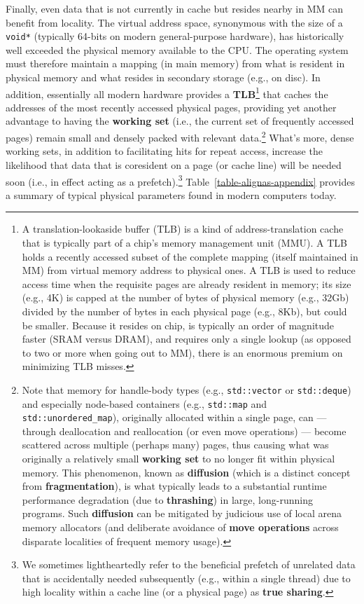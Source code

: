 Finally, even data that is not currently in cache but resides nearby in
MM can benefit from locality. The virtual address space, synonymous with
the size of a \texttt{void*} (typically 64-bits on modern general-purpose hardware), has historically well exceeded the physical memory
available to the CPU. The operating system must therefore maintain a
mapping (in main memory) from what is resident in physical memory and
what resides in secondary storage (e.g., on disc). In addition,
essentially all modern hardware provides a
\textbf{TLB}{\cprotect\footnote{A translation-lookaside buffer (TLB) is
a kind of address-translation cache that is typically part of a chip's
memory management unit (MMU). A TLB holds a recently accessed subset
of the complete mapping (itself maintained in MM) from virtual memory
address to physical ones. A TLB is used to reduce access time when the
requisite pages are already resident in memory; its size (e.g., 4K) is
capped at the number of bytes of physical memory (e.g., 32Gb) divided
by the number of bytes in each physical page (e.g., 8Kb), but could be
smaller. Because it resides on chip, is typically an order of
magnitude faster (SRAM versus DRAM), and requires only a single lookup
(as opposed to two or more when going out to MM), there is an enormous
  premium on minimizing TLB misses.}} that caches the addresses of the
most recently accessed physical pages, providing yet another advantage
to having the \textbf{working set} (i.e., the current set of frequently
accessed pages) remain small and densely packed with relevant
data.{\cprotect\footnote{Note that memory for handle-body
types (e.g., \texttt{std::vector} or \texttt{std::deque}) and
especially node-based containers (e.g., \texttt{std::map} and
\texttt{std::unordered\_map}), originally allocated within a single
page, can --- through deallocation and reallocation (or even move
operations) --- become scattered across multiple (perhaps many)
 pages, thus causing what was originally a relatively small \textbf{working set}
to no longer fit within physical memory. This phenomenon, known as
\textbf{diffusion} (which is a distinct concept from
\textbf{fragmentation}), is what typically leads to a substantial
runtime performance degradation (due to \textbf{thrashing}) in large,
long-running programs. Such \textbf{diffusion} can be mitigated by
judicious use of local arena memory allocators (and deliberate
avoidance of \textbf{move operations} across disparate localities of
  frequent memory usage).}} What's more, dense working sets, in addition
to facilitating hits for repeat access, increase the likelihood that
data that is coresident on a page (or cache line) will be needed soon
(i.e., in effect acting as a prefetch).{\cprotect\footnote{We sometimes
lightheartedly refer to the beneficial prefetch of unrelated data that
is accidentally needed subsequently (e.g., within a single thread) due
to high locality within a cache line (or a physical page) as
  \textbf{true sharing}.}} Table~\ref{table-alignas-appendix} provides a summary of typical physical parameters found in modern computers today.

